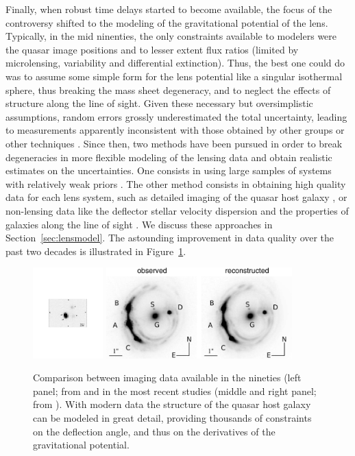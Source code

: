 Finally, when robust time delays started to become available, the
focus of the controversy shifted to the modeling of the gravitational
potential of the lens. Typically, in the mid ninenties, the only
constraints available to modelers were the quasar image positions and
to lesser extent flux ratios (limited by microlensing, variability and
differential extinction). Thus, the best one could do was to assume
some simple form for the lens potential like a singular isothermal
sphere, thus breaking the mass sheet degeneracy, and to neglect the
effects of structure along the line of sight. Given these necessary
but oversimplistic assumptions, random errors grossly underestimated
the total uncertainty, leading to measurements apparently inconsistent
with those obtained by other groups or other techniques
\cite{K+S04}. Since then, two methods have been pursued in order to
break degeneracies in more flexible modeling of the lensing data and
obtain realistic estimates on the uncertainties. One consists in using
large samples of systems with relatively weak priors
\cite{Ogu07b}. The other method consists in obtaining high quality data for 
each lens system, such as detailed imaging of the quasar host galaxy
\cite{Keeton:2000p241,WBB04,Suy++06}, or non-lensing data like the deflector 
stellar velocity dispersion \cite{T+K02b} and the properties of
galaxies along the line of sight \cite{K+Z04,Suy++10}. We discuss
these approaches in Section~\ref{sec:lensmodel}. The astounding
improvement in data quality over the past two decades is illustrated
in Figure~\ref{fig:oldvsmodernimage}.

\begin{figure}
\includegraphics[height=3.5cm]{figures/Schechter97_fg1.pdf}
\includegraphics[height=3.5cm]{figures/Suyu14_fig1.jpg}
\caption{Comparison between imaging data available in the nineties (left panel; from \cite{Sch++97} and in the most recent studies (middle and right panel; from \cite{Suy++14}). With modern data the structure of the quasar host galaxy can be modeled in great detail, providing thousands of constraints on the deflection angle, and thus on the derivatives of the gravitational potential.}
\label{fig:oldvsmodernimage}
\end{figure}

